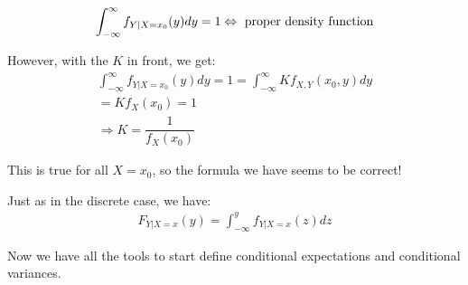 \begin{equation*}
  \begin{gathered}
    \int_{-\infty}^{\infty}f_{Y|X=x_0}(y)dy = 1\Leftrightarrow\text{ proper density function}
  \end{gathered}
\end{equation*}\par
\noindent However, with the $K$ in front, we get:
\begin{equation*}
  \begin{gathered}
    \int_{-\infty}^{\infty}f_{Y|X=x_0}(y)dy = 1 = \int_{-\infty}^{\infty}Kf_{X,Y}(x_0,y)dy\\
    = Kf_{X}(x_0) = 1\\
    \Rightarrow K = \dfrac{1}{f_X(x_0)}
  \end{gathered}
\end{equation*}\par
\noindent This is true for all $X =x_0$, so the formula we have seems to be correct!
\par\bigskip
\noindent Just as in the discrete case, we have:
\begin{equation*}
  \begin{gathered}
    F_{Y|X=x}(y) = \int_{-\infty}^{y}f_{Y|X=x}(z)dz
  \end{gathered}
\end{equation*}
\par\bigskip
\noindent Now we have all the tools to start define conditional expectations and conditional variances.
\newpage
